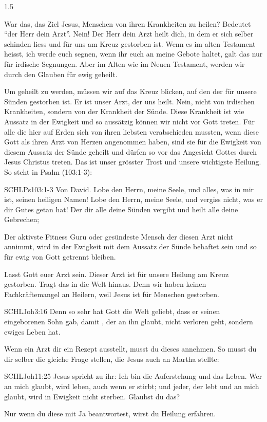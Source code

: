 \documentclass[fontsize=14pt]{../../inc/mybib}
\begin{document}
\begin{spacing}{1.5}
\begin{block}
        War das, das Ziel Jesus, Menschen von ihren Krankheiten zu heilen? Bedeutet  \enquote{der Herr dein Arzt}. Nein! Der Herr dein Arzt heilt dich, in dem er sich selber schinden liess und für uns am Kreuz gestorben ist. Wenn es im alten Testament heisst, ich werde euch segnen, wenn ihr euch an meine Gebote haltet, galt das nur für irdische Segnungen. Aber im Alten wie im Neuen Testament, werden wir durch den Glauben für ewig geheilt.

        Um geheilt zu werden, müssen wir auf das Kreuz blicken, auf den der für unsere Sünden gestorben ist. Er ist unser Arzt, der uns heilt. Nein, nicht von irdischen Krankheiten, sondern von der Krankheit der Sünde. Diese Krankheit ist wie Aussatz in der Ewigkeit und so aussätzig können wir nicht vor Gott treten. Für alle die hier auf Erden sich von ihren liebsten verabschieden mussten, wenn diese Gott als ihren Arzt von Herzen angenommen haben, sind sie für die Ewigkeit von diesem Aussatz der Sünde geheilt und dürfen so vor das Angesicht Gottes durch Jesus Christus treten. Das ist unser grösster Trost und unsere wichtigste Heilung. So steht in Psalm (103:1-3):
        \begin{bibelbox}{SCHL}{Ps}{103:1-3}
            Von David. Lobe den Herrn, meine Seele, und alles, was in mir ist, seinen heiligen Namen! Lobe den Herrn, meine Seele, und vergiss nicht, was er dir Gutes getan hat! Der dir alle deine Sünden vergibt und heilt alle deine Gebrechen;
        \end{bibelbox}
        
        Der aktivste Fitness Guru oder gesündeste Mensch der diesen Arzt nicht annimmt, wird in der Ewigkeit mit dem Aussatz der Sünde behaftet sein und so für ewig von Gott getrennt bleiben.

        Lasst Gott euer Arzt sein. Dieser Arzt ist für unsere Heilung am Kreuz gestorben. Tragt das in die Welt hinaus. Denn wir haben keinen Fachkräftemangel an Heilern, weil Jesus ist für  Menschen gestorben. 
        \begin{bibelbox}{SCHL}{Joh}{3:16}
        Denn so sehr hat Gott die Welt geliebt, dass er seinen eingeborenen Sohn gab, damit , der an ihn glaubt, nicht verloren geht, sondern ewiges Leben hat.
        \end{bibelbox}
        
        Wenn ein Arzt dir ein Rezept ausstellt, musst du dieses annehmen. So musst du dir selber die gleiche Frage stellen, die Jesus auch an Martha stellte:
        \begin{bibelbox}{SCHL}{Joh}{11:25}
            Jesus spricht zu ihr: Ich bin die Auferstehung und das Leben. Wer an mich glaubt, wird leben, auch wenn er stirbt; und jeder, der lebt und an mich glaubt, wird in Ewigkeit nicht sterben. Glaubst du das?
        \end{bibelbox}
         Nur wenn du diese mit Ja beantwortest, wirst du Heilung erfahren.


\end{block}
\end{spacing}
\end{document}
